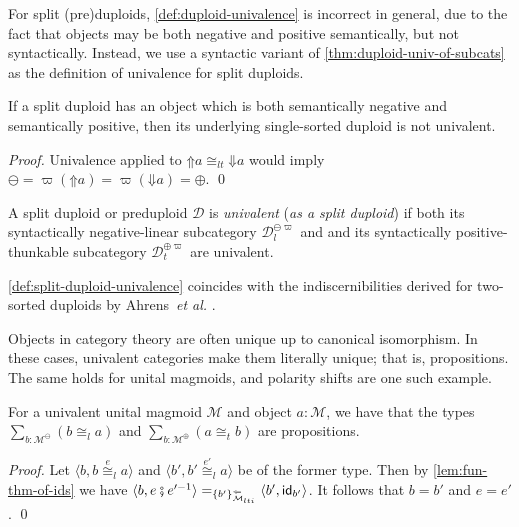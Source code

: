\documentclass[runningheads]{llncs}
\makeatletter
\newcommand*{\etal}{~\textit{et al.\@}}
\newcommand*\rocqlogo{\usebox{\rocqlogobox}}
\newcommand{\lemmaref}[3]{\href{https://github.com/UniMath/UniMath/blob/94fae0eda57a778cec704bfa73b4ff525c9bc475/#1\#L#2?name=#3}{\rocqlogo}}
\newcommand{\acat}[1]{\mathcal{#1}}
\newcommand{\D}{\acat{D}}
\newcommand{\M}{\acat{M}}
\newcommand{\Cl}[1]{#1_l}
\newcommand{\Ct}[1]{#1_t}
\newcommand{\Clt}[1]{#1_{lt}}
\newcommand{\Clti}[1]{#1_{lti}}
\newcommand{\Cn}[1]{#1^\ominus}
\newcommand{\Cp}[1]{#1^\oplus}
\newcommand{\Csn}[2]{#1^{\ominus#2}}
\newcommand{\Csp}[2]{#1^{\oplus#2}}
\newcommand{\Csnl}[2]{\Csn{\Cl{#1}}{#2}}
\newcommand{\Cspt}[2]{\Csp{\Ct{#1}}{#2}}
\newcommand{\id}{\mathsf{id}}
\newcommand{\dcomp}{\fatsemi}
\newcommand{\ifan}[2]{\{#2\}^{{\Leftarrow}}_{#1}}
\newcommand{\upshift}{\mathord{\Uparrow}}
\newcommand{\downshift}{\mathord{\Downarrow}}
\makeatother
\begin{document}
For split (pre)duploids, \autoref{def:duploid-univalence} is incorrect in
general, due to the fact that objects may be both negative and
positive semantically, but not syntactically. Instead, we use a
syntactic variant of \autoref{thm:duploid-univ-of-subcats} as the definition of
univalence for split duploids.

\begin{theorem}[{\lemmaref{UniMath/CategoryTheory/Nonassociative/Duploids/Univalence.v}{707}{neg\_is\_dupl\_univalent\_if\_split}}]
\label{lem:not-univalent-split-duploid}
If a split duploid has an object which is both semantically negative
and semantically positive, then its underlying single\hyp{}sorted duploid
is not univalent.
\end{theorem}
\begin{proof}
Univalence applied to \(\upshift{a} \Clt\cong \downshift{a}\) would
imply \(\ominus = \varpi(\upshift{a}) = \varpi(\downshift{a}) =
\oplus\).
\qed
\end{proof}

\begin{definition}[{\lemmaref{UniMath/CategoryTheory/Nonassociative/Duploids/Univalence.v}{91}{is\_split\_dupl\_univalent}}]
\label{def:split-duploid-univalence}
A split duploid or preduploid \(\D\) is \emph{univalent} (\emph{as a split
duploid}) if both its syntactically negative\hyp{}linear subcategory
\(\Csnl\D\varpi\) and and its syntactically positive\hyp{}thunkable
subcategory \(\Cspt\D\varpi\) are univalent.
\end{definition}
\begin{remark}
\autoref{def:split-duploid-univalence} coincides with the indiscernibilities
derived for two\hyp{}sorted duploids by Ahrens\etal{} \cite[Example 13.5]{Ahrens22}.
\end{remark}

Objects in category theory are often unique up to canonical
isomorphism. In these cases, univalent categories make them literally
unique; that is, propositions.  The same holds for unital magmoids,
and polarity shifts are one such example.

\begin{lemma}[{\lemmaref{UniMath/CategoryTheory/Nonassociative/UnitalMagmoids/Univalence.v}{137}{isaprop\_linear\_isos\_from\_negative}}]
\label{thm:um-universal-properties}
For a univalent unital magmoid \(\M\) and object \(a : \M\), we have
that the types \(\sum_{b:\Cn\M}(b \Cl\cong a)\) and \(\sum_{b:\Cp\M}(a
\Ct\cong b)\) are propositions.
\end{lemma}
\begin{proof}
Let \(\langle b, b \Cl{\overset{e}\cong} a \rangle\) and \(\langle b', b' \Cl{\overset{e'}\cong} a \rangle\) be of the former type. Then by
\autoref{lem:fun-thm-of-ids} we have \(\langle b, e \dcomp e'^{-1} \rangle
=_{\ifan{\Clti\M}{b'}} \langle b', \id_{b'} \rangle\). It follows that
\(b = b'\) and \(e = e'\).
\qed
\end{proof}
\end{document}
